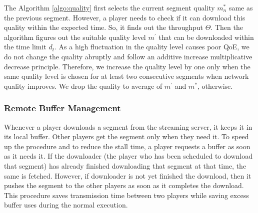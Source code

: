 The Algorithm \ref{algo:quality} first selects the current segment quality $m^*_{n}$ same as the previous segment. However, a player needs to check if it can download this quality within the expected time. So, it finds out the throughput $\varTheta$. Then the algorithm figures out the suitable quality level $m^\prime$ that can be downloaded within the time limit $d_t$. As a high fluctuation in the quality level causes poor QoE, we do not change the quality abruptly and follow an additive increase multiplicative decrease principle. Therefore, we increase the quality level by one only when the same quality level is chosen for at least two consecutive segments when network quality improves. We drop the quality to average of $m^\prime$ and $m^*$, otherwise. 
\subsubsection{Remote Buffer Management}
Whenever a player downloads a segment from the streaming server, it keeps it in its local buffer. Other players get the segment only when they need it. To speed up the procedure and to reduce the stall time, a player requests a buffer as soon as it needs it. If the downloader (the player who has been scheduled to download that segment) has already finished downloading that segment at that time, the same is fetched. However, if downloader is not yet finished the download, then it pushes the segment to the other players as soon as it completes the download. This procedure saves transmission time between two players while saving excess buffer uses during the normal execution.


